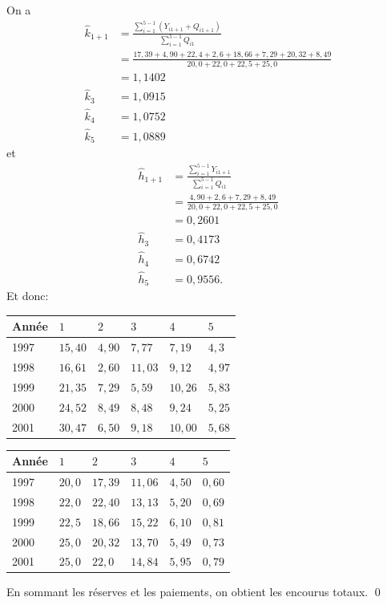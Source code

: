\begin{exemple}
  On a
  \begin{align*}
    \hat{k}_{1+1}
    &= \frac{\sum_{i=1}^{5-1} \left( Y_{i 1+1} + Q_{i 1+1} \right)}{\sum_{i=1}^{5-1} Q_{i 1}} \\
    &= \frac{17,39+4,90+22,4+2,6+18,66+7,29+20,32+8,49}{20,0+22,0+22,5+25,0} \\
    &= 1,1402\\
    \hat{k}_{3} &= 1,0915\\
    \hat{k}_{4} &= 1,0752\\
    \hat{k}_{5} &= 1,0889
  \end{align*}
  et
  \begin{align*}
    \hat{h}_{1+1}
    &= \frac{\sum_{i=1}^{5-1} Y_{i 1+1}}{\sum_{i=1}^{5-1} Q_{i 1}} \\
    &= \frac{4,90+2,6+7,29+8,49}{20,0+22,0+22,5+25,0} \\
    &= 0,2601 \\
    \hat{h}_{3} &= 0,4173\\
    \hat{h}_{4} &= 0,6742\\
    \hat{h}_{5} &= 0,9556.
  \end{align*}
  Et donc:
  \begin{center}
    \begin{tabular}{|l|l l l l l|}\hline
      Année & $1$ & $2$ & $3$ & $4$ & $5$  \\ \hline
      1997 &$15,40$& $4,90$& $7,77$& $7,19$& $4,3$\\
      1998 &$16,61$& $2,60$& $11,03$& $9,12$& $4,97$\\
      1999 &$21,35$& $7,29$& $5,59$& $10,26$& $5,83$\\
      2000 &$24,52$& $8,49$& $8,48$& $9,24$ &$5,25$\\
      2001 &$30,47$& $6,50$& $9,18$& $10,00$&$5,68$\\ \hline
    \end{tabular}
  \end{center}

  \begin{center}
    \begin{tabular}{|l|l l l l l|}\hline
      Année & $1$ & $2$ & $3$ & $4$ & $5$  \\ \hline
      1997 &$20,0$& $17,39$& $11,06$& $4,50$& $0,60$ \\
      1998 &$22,0$& $22,40$& $13,13$& $5,20$& $0,69$\\
      1999 &$22,5$& $18,66$& $15,22$& $6,10$& $0,81$\\
      2000 &$25,0$& $20,32$& $13,70$& $5,49$& $0,73$\\
      2001 &$25,0$& $22,0$ & $14,84$& $5,95$& $0,79$\\ \hline
    \end{tabular}
  \end{center}
  En sommant les réserves et les paiements, on obtient les encourus
  totaux. %
  \qed
\end{exemple}



